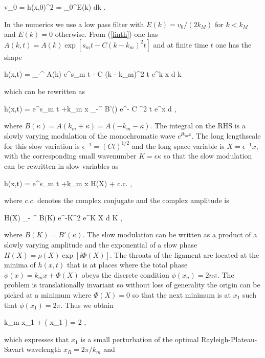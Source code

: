 \be
v_0 = \langle h(x,0)^2 \rangle = \int_0^\infty E(k) {\textrm{d}}k . 
\nd

In the numerics we use a low pass filter
with $E(k)= v_0/(2k_M)$ for $k<k_M$ and $E(k)=0$ otherwise. 
From (\ref{linth}) one has $A(k,t) = A(k) \exp[ s_m t -  C (k - k_m)^2 t]$ and 
at finite time $t$ one has the shape

\be
h(x,t) = \int_{-\infty}^{\infty}  A(k) e^{s_m t -  C (k - k_m)^2 t}  e^{\ii k x} {\textrm{d}} k
\nd

which can be rewritten as 

\be
h(x,t) =  e^{s_m t +\ii k_m x} \int_{-\infty}^{\infty}  B'(\kappa) e^{-  C \kappa^2 t}  e^{\ii \kappa x} {\textrm{d}} \kappa ,
\nd

where $B(\kappa) = A(k_m + \kappa) = \overline A(-k_m -\kappa)$.
The integral on the RHS is a slowly varying modulation of the monochromatic wave $e^{\ii k_m x}$. 
The long lengthscale for this slow variation is $\epsilon^{-1} = (C t)^{1/2}$ and 
the long space variable is $X = \epsilon^{-1} x$, with the corresponding small 
wavenumber $K = \epsilon \kappa$ so that the slow modulation can be rewritten in slow variables as

\be
h(x,t) =   e^{s_m t +\ii k_m x} H(X)  + c.c. \label{slowamp} , 
\nd

where $c.c.$ denotes the complex conjugate and the complex amplitude is

\be
H(X) \simeq \int_{- \infty}^{\infty}  B(K) e^{-K^2}  e^{\ii K X} {\textrm{d}} K \label{saddle} , 
\nd

where $B(K) = B'(\kappa)$. 
The slow modulation can be written as a product of a slowly varying amplitude 
and the exponential of a slow phase $H(X) = \rho(X) \exp [{ \ii \Phi(X) }]$. 
The throats of the  ligament are located at the minima of
$h(x,t)$ that is at places where the total phase
$\phi(x) =  k_m x + \Phi ( X) $ obeys the discrete condition $ \phi(x_n) = 2 n \pi $.
The problem is translationally invariant so without loss of generality the origin can be picked
at a minimum where $\Phi(X) = 0$ so that the next minimum is at $x_1$ such that  $\phi(x_1)= 2 \pi$.
Thus we obtain 

\be
k_m x_1 + \Phi ( \epsilon x_1 ) = 2 \pi , 
\nd

which expresses that $x_1$ is a small perturbation of the optimal Rayleigh-Plateau-Savart wavelength
$x_{R} = 2 \pi / k_m$ and

